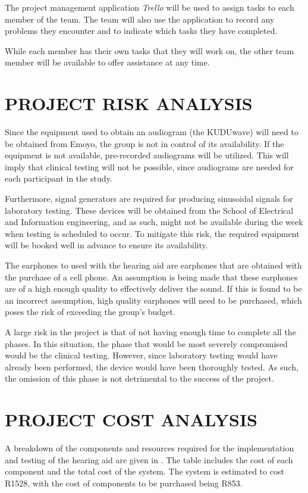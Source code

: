 \documentclass[10pt,twocolumn]{witseiepaper}
\begin{document}
The project management application \textit{Trello} will be used to assign tasks to each member of the team. The team will also use the application to record any problems they encounter and to indicate which tasks they have completed. 

While each member has their own tasks that they will work on, the other team member will be available to offer assistance at any time.

\section{PROJECT RISK ANALYSIS}

Since the equipment used to obtain an audiogram (the KUDUwave) will need to be obtained from Emoyo, the group is not in control of its availability. If the equipment is not available, pre-recorded audiograms will be utilized. This will imply that clinical testing will not be possible, since audiograms are needed for each participant in the study.

Furthermore, signal generators are required for producing sinusoidal signals for laboratory testing. These devices will be obtained from the School of Electrical and Information engineering, and as such, might not be available during the week when testing is scheduled to occur. To mitigate this risk, the required equipment will be booked well in advance to ensure its availability.

The earphones to used with the hearing aid are earphones that are obtained with the purchase of a cell phone. An assumption is being made that these earphones are of a high enough quality to effectively deliver the sound. If this is found to be an incorrect assumption, high quality earphones will need to be purchased, which poses the risk of exceeding the group's budget.

A large risk in the project is that of not having enough time to complete all the phases. In this situation, the phase that would be most severely compromised would be the clinical testing. However, since laboratory testing would have already been performed, the device would have been thoroughly tested. As such, the omission of this phase is not detrimental to the success of the project.

\section{PROJECT COST ANALYSIS}
A breakdown of the components and resources required for the implementation and testing of the hearing aid are given in . The table includes the cost of each component and the total cost of the system. The system is estimated to cost R1528, with the cost of components to be purchased being R853.
\end{document}
